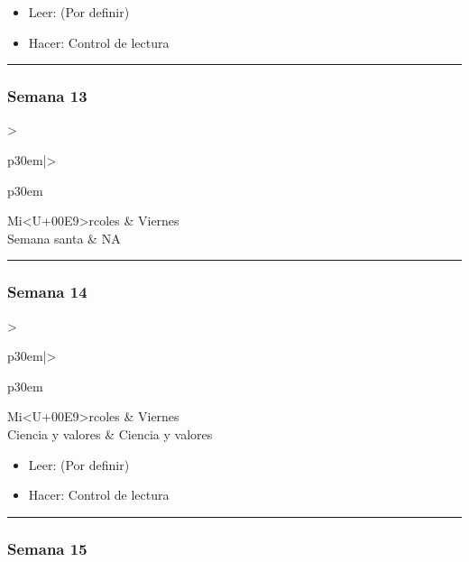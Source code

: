 \documentclass[spanish,]{article}
\begin{document}
\begin{itemize}
\item
  Leer: (Por definir)
\item
  Hacer: Control de lectura
\end{itemize}

\begin{center}\rule{0.5\linewidth}{\linethickness}\end{center}

\subsubsection{Semana 13}\label{semana-13}

\begin{tabular}{>{\raggedright\arraybackslash}p{30em}|>{\raggedright\arraybackslash}p{30em}}
\hline
Mi<U+00E9>rcoles & Viernes\\
\hline
Semana santa & NA\\
\hline
\end{tabular}

\begin{center}\rule{0.5\linewidth}{\linethickness}\end{center}

\subsubsection{Semana 14}\label{semana-14}

\begin{tabular}{>{\raggedright\arraybackslash}p{30em}|>{\raggedright\arraybackslash}p{30em}}
\hline
Mi<U+00E9>rcoles & Viernes\\
\hline
Ciencia y valores & Ciencia y valores\\
\hline
\end{tabular}

\begin{itemize}
\item
  Leer: (Por definir)
\item
  Hacer: Control de lectura
\end{itemize}

\begin{center}\rule{0.5\linewidth}{\linethickness}\end{center}

\subsubsection{Semana 15}\label{semana-15}
\end{document}
